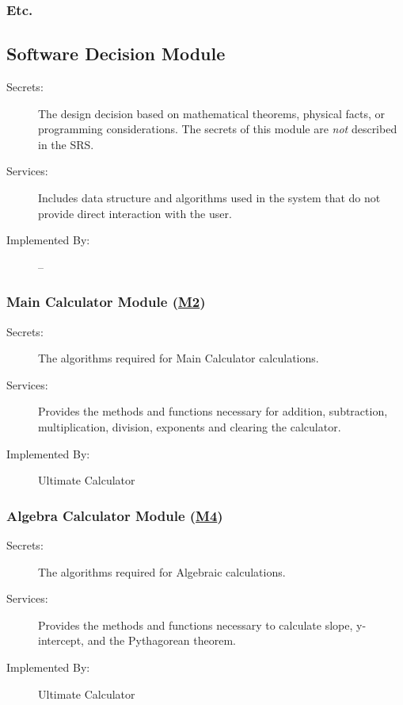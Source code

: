 \documentclass[12pt, titlepage]{article}
\begin{document}
\subsubsection{Etc.}


\subsection{Software Decision Module}

\begin{description}
\item[Secrets:] The design decision based on mathematical theorems, physical
  facts, or programming considerations. The secrets of this module are
  \emph{not} described in the SRS.
\item[Services:] Includes data structure and algorithms used in the system that
  do not provide direct interaction with the user. 
\item[Implemented By:] --
\end{description}

\subsubsection{Main Calculator Module (\hyperref[m2]{M2})}

\begin{description}
\item[Secrets:]The algorithms required for Main Calculator calculations.
\item[Services:] Provides the methods and functions necessary for addition, subtraction, multiplication, division, exponents and clearing the calculator.
\item[Implemented By:] Ultimate Calculator
\end{description}

\subsubsection{Algebra Calculator Module (\hyperref[m4]{M4})}

\begin{description}
\item[Secrets:]The algorithms required for Algebraic calculations.
\item[Services:] Provides the methods and functions necessary to calculate slope, y-intercept, and the Pythagorean theorem.
\item[Implemented By:] Ultimate Calculator
\end{description}
\end{document}
